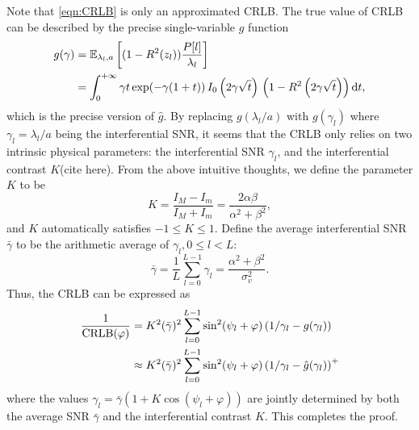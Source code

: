 \documentclass[12pt,draftclsnofoot,journal,onecolumn]{IEEEtran}
\theoremstyle{nonumberplain}
\def \exp {\text{exp}}
\begin{document}
\begin{IEEEproof}
    Note that \eqref{eqn:CRLB} is only an approximated CRLB. The true value of CRLB can be described by the precise single-variable $g$ function 
    \begin{equation}
        \begin{aligned}
            g(\gamma) &= \mathbb{E}_{\lambda_l, a}\left[(1-R^2(z_l))\frac{P[l]}{\lambda_l}\right] \\
            & = \int_{0}^{+\infty}\gamma t \,\exp(-\gamma(1+t))\, I_0\left(2\gamma\sqrt{t}\right)\,\left(1-R^2\left(2\gamma\sqrt{t}\right)\right){\rm d}t,
        \end{aligned}
        \label{eqn:precise_g_function}
    \end{equation}
    which is the precise version of $\hat{g}$. By replacing $g(\lambda_l/a)$ with $g(\gamma_l)$ where $\gamma_l = \lambda_l / a$ being the interferential SNR, it seems that the CRLB only relies on two intrinsic physical parameters: the interferential SNR $\gamma_l$, and the interferential contrast $K$(cite here). From the above intuitive thoughts, we define the parameter $K$ to be  
    \begin{equation}
        K = \frac{I_M - I_m}{I_M + I_m} = \frac{2\alpha\beta}{\alpha^2+\beta^2},
    \end{equation}
    and $K$ automatically satisfies $-1\leq K\leq 1$. Define the average interferential SNR $\bar{\gamma}$ to be the arithmetic average of $\gamma_l, 0\leq l < L$:
    \begin{equation}
        \bar{\gamma} = \frac{1}{L}\sum_{l=0}^{L-1}{\gamma_l} = \frac{\alpha^2+\beta^2}{\sigma_v^2}.
    \end{equation}
    Thus, the CRLB can be expressed as 
    \begin{equation}
        \begin{aligned}
            \frac{1}{{\rm CRLB}(\varphi)} &= K^2(\bar{\gamma})^2 \sum_{l=0}^{L-1}{ \sin^2(\psi_l+\varphi) \left(1/\gamma_l-g(\gamma_l)\right) }\\
            & \approx K^2(\bar{\gamma})^2 \sum_{l=0}^{L-1}{ \sin^2(\psi_l+\varphi) \left(1/\gamma_l-\hat{g}(\gamma_l)\right)^{+} }
        \end{aligned}
        \label{eqn:CRLB_simple}
    \end{equation}
    where the values $\gamma_l=\bar{\gamma}\left(1+K\cos(\psi_l+\varphi)\right)$ are jointly determined by both the average SNR $\bar{\gamma}$ and the interferential contrast $K$. This completes the proof.

\end{IEEEproof}
\end{document}
